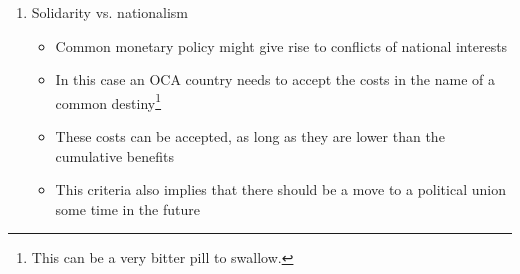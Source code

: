 \documentclass{tufte-handout}
\begin{document}
\begin{enumerate}
	\item Solidarity vs. nationalism
	\begin{itemize}
	  \item Common monetary policy might give rise to conflicts of national interests
	  \item In this case an OCA country needs to accept the costs in the name of a common destiny\footnote{This can be a very bitter pill to swallow.}
	  \item These costs can be accepted, as long as they are lower than the cumulative benefits
	  \item This criteria also implies that there should be a move to a political union some time in the future
	\end{itemize}	
\end{enumerate}
\end{document}
